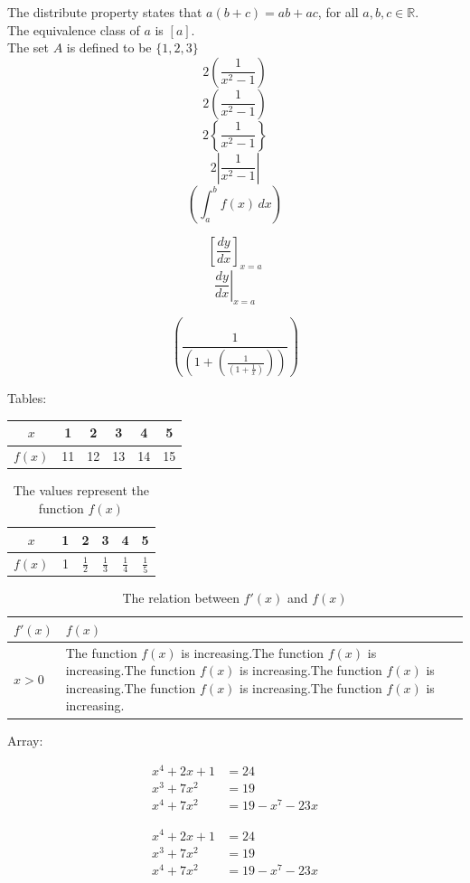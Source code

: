 \documentclass[11pt]{article}
\begin{document}
The distribute property states that $ a(b+c) = ab + ac $, for all
$ a,b,c \in \mathbb{R} $. \\[6pt]
The equivalence class of $a$ is $[a]$.\\[5pt]
The set $A$ is defined to be $\{1,2,3\}$\\[6pt]

$$ 2(\frac{1}{x^2 - 1}) $$
$$ 2\left(\frac{1}{x^2 - 1}\right) $$
$$ 2\left\{\frac{1}{x^2 - 1}\right\} $$
$$ 2\left|\frac{1}{x^2 - 1}\right| $$
$$ \left(\int_{a}^{b}f(x)\,dx\right) $$


$$ \left[\frac{dy}{dx}\right]_{x=a} $$
$$ \left.\frac{dy}{dx}\right|_{x=a} $$

$$ \left(\frac{1}{\left(1 + \left(\frac{1}{\left(1+\frac{1}{x}\right)}\right)\right)}\right) $$

Tables:\\

\begin{tabular}{|c||c|c|c|c|c|}
    \hline
    $x$ & 1 & 2 & 3 & 4 & 5\\ \hline
    $f(x)$ & 11 & 12 & 13 & 14 & 15 \\ \hline
\end{tabular}

\vspace{1 cm}

\begin{table}[H]
    \centering
    \def\arraystretch{1.5}
    \begin{tabular}{|c||c|c|c|c|c|}
        \hline
        $x$ & 1 & 2 & 3 & 4 & 5\\ \hline
        $f(x)$ & 1 & $\frac{1}{2}$ & $\frac{1}{3}$ & $\frac{1}{4}$ & $\frac{1}{5}$ \\ \hline
    \end{tabular}
    \caption{The values represent the function $f(x)$}
\end{table}

\vspace{1 cm}

\begin{table}[H]
    \centering
    \def\arraystretch{1.5}
    \begin{tabular}{|l|p{3in}|}
        \hline
        $f'(x)$ & $f(x)$ \\ \hline
        $x>0$ & The function $f(x)$ is increasing.The function $f(x)$ is increasing.The function $f(x)$ is increasing.The function $f(x)$ is increasing.The function $f(x)$ is increasing.The function $f(x)$ is increasing.\\ \hline
    \end{tabular}
    \caption{The relation between $f'(x)$ and $f(x)$}
\end{table}

Array:

\begin{align}
    x^4 + 2x + 1 &= 24\\
    x^3 + 7x^2 &= 19\\
    x^4 + 7x^2 &= 19 - x^7 -23x
\end{align}

\begin{align*}
    x^4 + 2x + 1 &= 24\\
    x^3 + 7x^2 &= 19\\
    x^4 + 7x^2 &= 19 - x^7 -23x
\end{align*}
\end{document}

